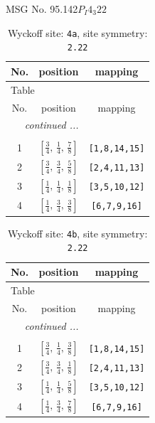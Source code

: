 \documentclass[fleqn,8pt]{jsarticle}
\begin{document}
\setcounter{MaxMatrixCols}{32}

\renewcommand{\tablename}{Table~}
\renewcommand{\figurename}{Figure~}
\begin{center}
\LARGE
MSG No. 95.142\quad$P_{I}4_{3}22$
\end{center}
\renewcommand{\arraystretch}{1.2}
\begin{longtable}{ccc}
\caption{Wyckoff site: {\tt 4a}, site symmetry: {\tt 2.22}}
 \\
 \hline \hline
No. & position & mapping \\ \hline \endfirsthead

\multicolumn{2}{l}{\tablename\ \thetable{}} \\
 \hline \hline
No. & position & mapping \\ \hline \endhead

 \hline \hline
\multicolumn{2}{r}{\footnotesize\it continued ...} \\ \endfoot

 \hline \hline
\multicolumn{2}{r}{} \\ \endlastfoot

1 & $\left[ \frac{3}{4},\, \frac{1}{4},\, \frac{7}{8} \right]$ & {\tt [1,8,14,15]} \\ \hline
2 & $\left[ \frac{3}{4},\, \frac{3}{4},\, \frac{5}{8} \right]$ & {\tt [2,4,11,13]} \\ \hline
3 & $\left[ \frac{1}{4},\, \frac{1}{4},\, \frac{1}{8} \right]$ & {\tt [3,5,10,12]} \\ \hline
4 & $\left[ \frac{1}{4},\, \frac{3}{4},\, \frac{3}{8} \right]$ & {\tt [6,7,9,16]} \\
\end{longtable}
\renewcommand{\arraystretch}{1.2}
\begin{longtable}{ccc}
\caption{Wyckoff site: {\tt 4b}, site symmetry: {\tt 2.22}}
 \\
 \hline \hline
No. & position & mapping \\ \hline \endfirsthead

\multicolumn{2}{l}{\tablename\ \thetable{}} \\
 \hline \hline
No. & position & mapping \\ \hline \endhead

 \hline \hline
\multicolumn{2}{r}{\footnotesize\it continued ...} \\ \endfoot

 \hline \hline
\multicolumn{2}{r}{} \\ \endlastfoot

1 & $\left[ \frac{3}{4},\, \frac{1}{4},\, \frac{3}{8} \right]$ & {\tt [1,8,14,15]} \\ \hline
2 & $\left[ \frac{3}{4},\, \frac{3}{4},\, \frac{1}{8} \right]$ & {\tt [2,4,11,13]} \\ \hline
3 & $\left[ \frac{1}{4},\, \frac{1}{4},\, \frac{5}{8} \right]$ & {\tt [3,5,10,12]} \\ \hline
4 & $\left[ \frac{1}{4},\, \frac{3}{4},\, \frac{7}{8} \right]$ & {\tt [6,7,9,16]} \\
\end{longtable}
\end{document}
